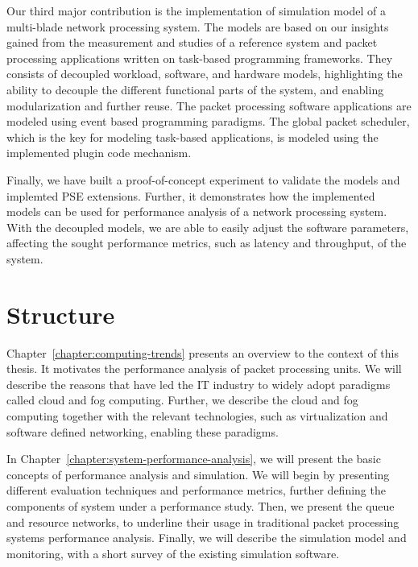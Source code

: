 Our third major contribution is the implementation of simulation model of a multi-blade network processing system. The models are based on our insights gained from the measurement and studies of a reference system and packet processing applications written on task-based programming frameworks. They consists of decoupled workload, software, and hardware models, highlighting the ability to decouple the different functional parts of the system, and enabling modularization and further reuse. The packet processing software applications are modeled using event based programming paradigms. The global packet scheduler, which is the key for modeling task-based applications, is modeled using the implemented plugin code mechanism.

Finally, we have built a proof-of-concept experiment to validate the models and implemted PSE extensions. Further, it demonstrates how the implemented models can be used for performance analysis of a network processing system. With the decoupled models, we are able to easily adjust the software parameters, affecting the sought performance metrics, such as latency and throughput, of the system.

\section{Structure}
Chapter~\ref{chapter:computing-trends} presents an overview to the context of this thesis. It motivates the performance analysis of packet processing units. We will describe the reasons that have led the IT industry to widely adopt paradigms called cloud and fog computing. Further, we describe the cloud and fog computing together with the relevant technologies, such as virtualization and software defined networking, enabling these paradigms.


In Chapter~\ref{chapter:system-performance-analysis}, we will present the basic concepts of performance analysis and simulation. We will begin by presenting different evaluation techniques and performance metrics, further defining the components of system under a performance study. Then, we present the queue and resource networks, to underline their usage in traditional packet processing systems performance analysis. Finally, we will describe the simulation model and monitoring, with a short survey of the existing simulation software.

